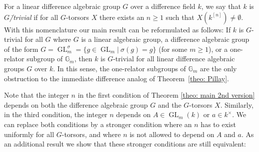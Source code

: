 \documentclass[oneside,reqno]{amsart}
\newtheorem{rem}[theo]{Remark}
\theoremstyle{definition}
\newcommand{\G}{\mathcal{G}}
\newcommand{\Gl}{\operatorname{GL}}
\newcommand{\s}{\sigma}
\newcommand{\Gm}{\mathbb{G}_m}
\newcommand{\kn}{k^{[n]}}
\newcommand{\pt}{{\rm{(P3$^u$)}}}
\begin{document}



For a linear difference algebraic group $G$ over a difference field $k$, we say that $k$ is \emph{$G$\=/trivial} if for all $G$-torsors $X$ there exists an $n\geq 1$ such that $X(k^{[n]})\neq \emptyset$. With this nomenclature our main result can be reformulated as follows: If $k$ is  $G$-trivial for all $G$ where $G$ is a linear algebraic group, a difference algebraic group of the form $G=\Gl_m^\s=\{g\in\Gl_m|\ \s(g)=g\}$ (for some $m\geq 1$), or a one-relator subgroup of $\Gm$, then $k$ is  $G$-trivial for all linear difference algebraic groups $G$ over $k$. In this sense, the one-relator subgroups of $\Gm$ are the only obstruction to the immediate difference analog of Theorem~\ref{theo: Pillay}. 

Note that the integer $n$ in the first condition of Theorem \ref{theo: main 2nd version} depends on both the difference algebraic group $G$ and the $G$-torsors $X$. Similarly, in the third condition, the integer $n$ depends on $A\in \Gl_m(k)$ or $a\in k^\times$. We can replace both conditions by a stronger condition where an $n$ has to exist uniformly for all $G$-torsors, and where $n$ is not allowed to depend on $A$ and $a$. As an additional result we show that these stronger conditions are still equivalent:
\end{document}
